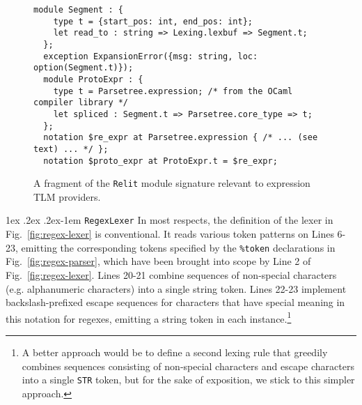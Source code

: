 \documentclass[acmsmall]{acmart}
\makeatletter
\renewcommand{\subsubsection}{%
  \@startsection{subsubsection}{3}%
  {\z@}{1ex \@plus .2ex \@minus .2ex}{-1em}%
  {\normalfont\normalsize\bfseries}%
}
\newcommand{\li}[1]{\lstinline[basicstyle=\ttfamily\fontsize{9pt}{1em}\selectfont]{#1}}
\makeatother
\begin{document}
\begin{figure}
\begin{lstlisting}[deletekeywords={spliced}]
  module Segment : { 
    type t = {start_pos: int, end_pos: int};
    let read_to : string => Lexing.lexbuf => Segment.t;
  };
  exception ExpansionError({msg: string, loc: option(Segment.t)});
  module ProtoExpr : { 
    type t = Parsetree.expression; /* from the OCaml compiler library */
    let spliced : Segment.t => Parsetree.core_type => t;
  };
  notation $re_expr at Parsetree.expression { /* ... (see text) ... */ };
  notation $proto_expr at ProtoExpr.t = $re_expr;
\end{lstlisting}
\caption{A fragment of the \li{Relit} module signature relevant to expression TLM providers.}
\label{fig:relit-util}
\vspace{-4px}
\end{figure}

\subsubsection{\li{RegexLexer}}
\label{sec:regex-lexer}
In most respects, the definition of the lexer in Fig.~\ref{fig:regex-lexer} is conventional. It reads various token patterns on Lines 6-23, emitting the corresponding tokens specified by the \lstinline[morekeywords={token}]{%token} declarations in Fig.~\ref{fig:regex-parser}, which have been brought into scope by Line 2 of Fig.~\ref{fig:regex-lexer}. Lines 20-21 combine sequences of non-special characters (e.g. alphanumeric characters) into a single string token. Lines 22-23 implement backslash-prefixed escape sequences for characters that have special meaning in this notation for regexes, emitting a string token in each instance.\footnote{A better approach would be to define a second lexing rule that greedily combines sequences consisting of non-special characters and escape characters into a single \li{STR} token, but for the sake of exposition, we stick to this simpler approach.}  
\end{document}
